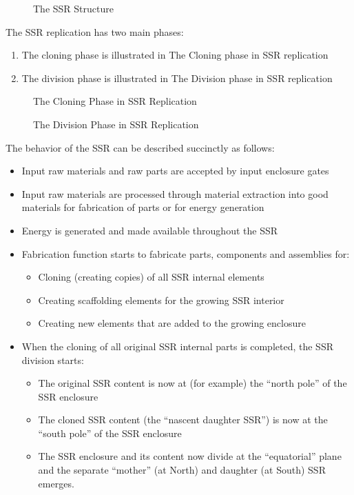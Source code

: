 \begin{figure}
	\caption{The SSR Structure}
	\label{fig:ssr_structure}
\end{figure}

The SSR replication has two main phases:

\begin{enumerate}
\item The cloning phase is illustrated in  The Cloning phase in SSR
replication
\item The division phase is illustrated in  The Division phase in SSR
replication
\end{enumerate}


\begin{figure}
	\caption{The Cloning Phase in SSR Replication}
	\label{ref:cloning_phase}
\end{figure}

\begin{figure}
	\caption{The Division Phase in SSR Replication}
	\label{ref:division_phase}
\end{figure}

The behavior of the SSR can be described succinctly as follows:

\begin{itemize}
\item Input raw materials and raw parts are accepted by input enclosure
gates
\item Input raw materials are processed through material extraction into
good materials for fabrication of parts or for energy generation
\item Energy is generated and made available throughout the SSR
\item Fabrication function starts to fabricate parts, components and
assemblies for: 

\begin{itemize}
\item Cloning (creating copies) of all SSR internal elements
\item Creating scaffolding elements for the growing SSR interior
\item Creating new elements that are added to the growing enclosure
\end{itemize}
\item When the cloning of all original SSR internal parts is completed,
the SSR division starts:

\begin{itemize}
\item The original SSR content is now at (for example) the “north pole”
of the SSR enclosure
\item The cloned SSR content (the “nascent daughter SSR”) is now at the
“south pole” of the SSR enclosure
\item The SSR enclosure and its content now divide at the “equatorial”
plane and the separate “mother” (at North) and daughter (at South) SSR
emerges.
\end{itemize}
\end{itemize}

